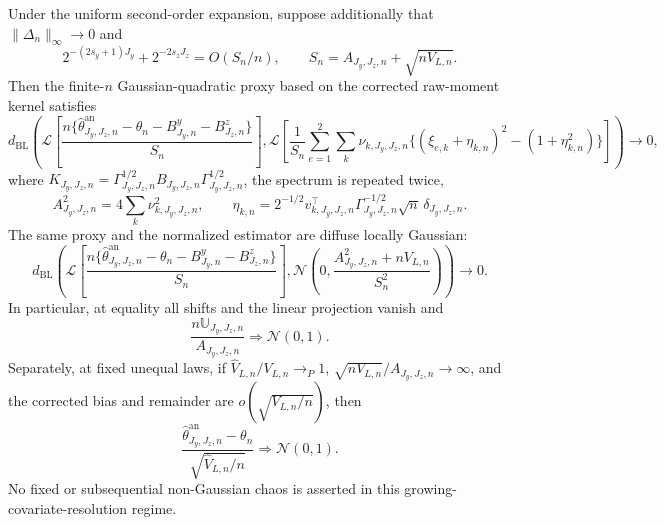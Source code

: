 Under the uniform second-order expansion, suppose additionally that \(\|\Delta_n\|_\infty\to0\) and
\[
2^{-(2s_y+1)J_y}+2^{-2s_zJ_z}=O(S_n/n),
\qquad
S_n=A_{J_y,J_z,n}+\sqrt{nV_{L,n}}.
\]
Then the finite-\(n\) Gaussian-quadratic proxy based on the corrected raw-moment kernel satisfies
\[
d_{\mathrm{BL}}\!\left(
\mathcal L\left[\frac{n\{\widehat\theta^{\mathrm{an}}_{J_y,J_z,n}-\theta_n-B^y_{J_y,n}-B^z_{J_z,n}\}}{S_n}\right],
\mathcal L\left[\frac1{S_n}\sum_{e=1}^2\sum_k\nu_{k,J_y,J_z,n}
\{(\xi_{e,k}+\eta_{k,n})^2-(1+\eta_{k,n}^2)\}\right]
\right)\to0,
\]
where \(K_{J_y,J_z,n}=\Gamma_{J_y,J_z,n}^{1/2}B_{J_y,J_z,n}\Gamma_{J_y,J_z,n}^{1/2}\), the spectrum is repeated twice,
\[
A_{J_y,J_z,n}^2=4\sum_k\nu_{k,J_y,J_z,n}^2,
\qquad
\eta_{k,n}=2^{-1/2}v_{k,J_y,J_z,n}^{\top}\Gamma_{J_y,J_z,n}^{-1/2}\sqrt n\,\delta_{J_y,J_z,n}.
\]
The same proxy and the normalized estimator are diffuse locally Gaussian:
\[
d_{\mathrm{BL}}\!\left(
\mathcal L\left[\frac{n\{\widehat\theta^{\mathrm{an}}_{J_y,J_z,n}-\theta_n-B^y_{J_y,n}-B^z_{J_z,n}\}}{S_n}\right],
\mathcal N\!\left(0,\frac{A_{J_y,J_z,n}^2+nV_{L,n}}{S_n^2}\right)
\right)\to0.
\]
In particular, at equality all shifts and the linear projection vanish and
\[
\frac{n\mathbb U_{J_y,J_z,n}}{A_{J_y,J_z,n}}\Rightarrow\mathcal N(0,1).
\]
Separately, at fixed unequal laws, if \(\widehat V_{L,n}/V_{L,n}\to_P1\), \(\sqrt{nV_{L,n}}/A_{J_y,J_z,n}\to\infty\), and the corrected bias and remainder are \(o(\sqrt{V_{L,n}/n})\), then
\[
\frac{\widehat\theta^{\mathrm{an}}_{J_y,J_z,n}-\theta_n}{\sqrt{\widehat V_{L,n}/n}}\Rightarrow\mathcal N(0,1).
\]
No fixed or subsequential non-Gaussian chaos is asserted in this growing-covariate-resolution regime.